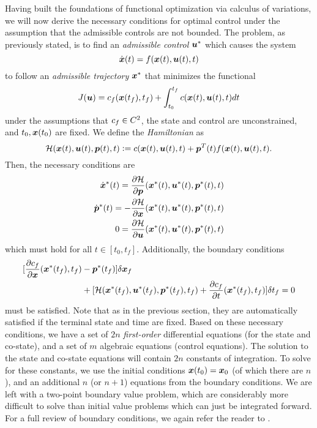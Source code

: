 Having built the foundations of functional optimization via calculus of variations, we will now derive the necessary conditions for optimal control under the assumption that the admissible controls are not bounded. The problem, as previously stated, is to find an \textit{admissible control} $\bm{u}^*$ which causes the system 
\begin{equation}
    \dot{\bm{x}}(t) = f(\bm{x}(t),\bm{u}(t),t)
\end{equation}
to follow an \textit{admissible trajectory} $\bm{x}^*$ that minimizes the functional
\begin{equation}
    J(\bm{u}) = c_f(\bm{x}(t_f),t_f) + \int_{t_0}^{t_f} c(\bm{x}(t),\bm{u}(t),t) dt
\end{equation}
under the assumptions that $c_f \in C^2$, the state and control are unconstrained, and $t_0, \bm{x}(t_0)$ are fixed. We define the \textit{Hamiltonian} as
\begin{equation}
    \mathcal{H}(\bm{x}(t),\bm{u}(t),\bm{p}(t),t) \vcentcolon= c(\bm{x}(t),\bm{u}(t),t) + \bm{p}^T(t) f(\bm{x}(t),\bm{u}(t),t).
\end{equation}
Then, the necessary conditions are 
\begin{align}
\label{eq:nec_ham_conds1}
    \dot{\bm{x}}^*(t) = \frac{\partial \mathcal{H}}{\partial \bm{p}}(\bm{x}^*(t),\bm{u}^*(t),\bm{p}^*(t),t)\\
    \dot{\bm{p}}^*(t) = -\frac{\partial \mathcal{H}}{\partial \bm{x}}(\bm{x}^*(t),\bm{u}^*(t),\bm{p}^*(t),t)\\
    0 = \frac{\partial \mathcal{H}}{\partial \bm{u}}(\bm{x}^*(t),\bm{u}^*(t),\bm{p}^*(t),t)
    \label{eq:nec_ham_conds3}
\end{align}
which must hold for all $t \in [t_0,t_f]$. Additionally, the boundary conditions 
\begin{align}
\label{eq:ham_bcs}
    [\frac{\partial c_f}{\partial \bm{x}}(\bm{x}^*(t_f),t_f)& - \bm{p}^*(t_f)] \delta \bm{x}_f\\
    & + [ \mathcal{H}(\bm{x}^*(t_f),\bm{u}^*(t_f), \bm{p}^*(t_f), t_f) + \frac{\partial c_f}{\partial t}(\bm{x}^*(t_f),t_f)] \delta t_f = 0 \nonumber
\end{align}
must be satisfied. Note that as in the previous section, they are automatically satisfied if the terminal state and time are fixed. Based on these necessary conditions, we have a set of $2n$ \textit{first-order} differential equations (for the state and co-state), and a set of $m$ algebraic equations (control equations). The solution to the state and co-state equations will contain $2n$ constants of integration. To solve for these constants, we use the initial conditions $\bm{x}(t_0) = \bm{x}_0$ (of which there are $n$), and an additional $n$ (or $n+1$) equations from the boundary conditions. We are left with a two-point boundary value problem, which are considerably more difficult to solve than initial value problems which can just be integrated forward. For a full review of boundary conditions, we again refer the reader to \cite{kirk2012optimal}.

